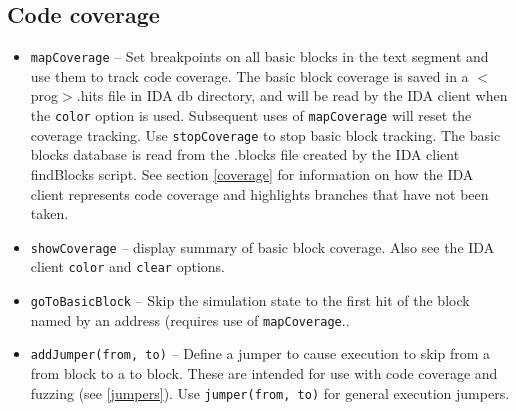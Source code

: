 \documentclass[titlepage]{article}
\begin{document}
\subsection{Code coverage}
\label{code-coverage}
\begin{itemize}
\item {\tt mapCoverage} -- Set breakpoints on all basic blocks in the text segment and use them to track code coverage. The basic block coverage is
saved in a $<$prog$>$.hits file in IDA db directory, and will be read by the IDA client when the {\tt color} option is used. Subsequent uses of {\tt mapCoverage}
will reset the coverage tracking.  Use {\tt stopCoverage} to stop basic block tracking.  The basic blocks database is read from the .blocks file created
by the IDA client findBlocks script.  See section \ref{coverage} for information on how the IDA client represents code coverage and highlights
branches that have not been taken.

\item {\tt showCoverage} -- display summary of basic block coverage.  Also see the IDA client {\tt color} and {\tt clear} options.

\item{\tt goToBasicBlock} -- Skip the simulation state to the first hit of the block named by an address (requires use of {\tt mapCoverage}..

\item{\tt addJumper(from, to)} -- Define a jumper to cause execution to skip from a from block to a to block.  These are intended for use with code coverage and fuzzing (see \ref{jumpers}).
Use {\tt jumper(from, to)} for general execution jumpers.
\end{itemize}
\end{document}
